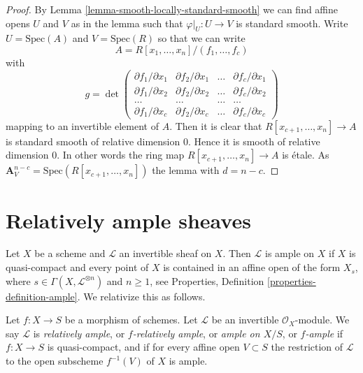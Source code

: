 \begin{proof}
By
Lemma \ref{lemma-smooth-locally-standard-smooth}
we can find affine opens $U$ and $V$ as in the lemma such that
$\varphi|_U : U \to V$ is standard smooth. Write
$U = \text{Spec}(A)$ and $V = \text{Spec}(R)$ so that we can write
$$
A = R[x_1, \ldots, x_n]/(f_1, \ldots, f_c)
$$
with
$$
g =
\det
\left(
\begin{matrix}
\partial f_1/\partial x_1 &
\partial f_2/\partial x_1 &
\ldots &
\partial f_c/\partial x_1 \\
\partial f_1/\partial x_2 &
\partial f_2/\partial x_2 &
\ldots &
\partial f_c/\partial x_2 \\
\ldots & \ldots & \ldots & \ldots \\
\partial f_1/\partial x_c &
\partial f_2/\partial x_c &
\ldots &
\partial f_c/\partial x_c
\end{matrix}
\right)
$$
mapping to an invertible element of $A$. Then it is clear that
$R[x_{c + 1}, \ldots, x_n] \to A$ is standard smooth of relative
dimension $0$. Hence it is smooth of relative dimension $0$.
In other words the ring map $R[x_{c + 1}, \ldots, x_n] \to A$
is \'etale. As $\mathbf{A}^{n - c}_V = \text{Spec}(R[x_{c + 1}, \ldots, x_n])$
the lemma with $d = n - c$.
\end{proof}
















\section{Relatively ample sheaves}
\label{section-relatively-ample}

\noindent
Let $X$ be a scheme and $\mathcal{L}$ an invertible sheaf on $X$.
Then $\mathcal{L}$ is ample on $X$ if $X$ is quasi-compact and
every point of $X$ is contained in an affine open of the form
$X_s$, where $s \in \Gamma(X, \mathcal{L}^{\otimes n})$ and $n \geq 1$, see
Properties, Definition \ref{properties-definition-ample}.
We relativize this as follows.

\begin{definition}
\label{definition-relatively-ample}
Let $f : X \to S$ be a morphism of schemes.
Let $\mathcal{L}$ be an invertible $\mathcal{O}_X$-module.
We say $\mathcal{L}$ is {\it relatively ample}, or {\it $f$-relatively ample},
or {\it ample on $X/S$}, or {\it $f$-ample} if $f : X \to S$
is quasi-compact, and if for every affine open $V \subset S$
the restriction of $\mathcal{L}$ to the open subscheme
$f^{-1}(V)$ of $X$ is ample.
\end{definition}

